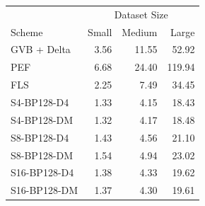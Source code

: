 \begin{tabular}{lrrr}
\toprule
 & \multicolumn{3}{c}{Dataset Size} \\
Scheme & Small & Medium & Large \\
\midrule
GVB + Delta & 3.56 & 11.55 & 52.92 \\
PEF & 6.68 & 24.40 & 119.94 \\
FLS & 2.25 & 7.49 & 34.45 \\
S4-BP128-D4 & 1.33 & 4.15 & 18.43 \\
S4-BP128-DM & 1.32 & 4.17 & 18.48 \\
S8-BP128-D4 & 1.43 & 4.56 & 21.10 \\
S8-BP128-DM & 1.54 & 4.94 & 23.02 \\
S16-BP128-D4 & 1.38 & 4.33 & 19.62 \\
S16-BP128-DM & 1.37 & 4.30 & 19.61 \\
\bottomrule
\end{tabular}
